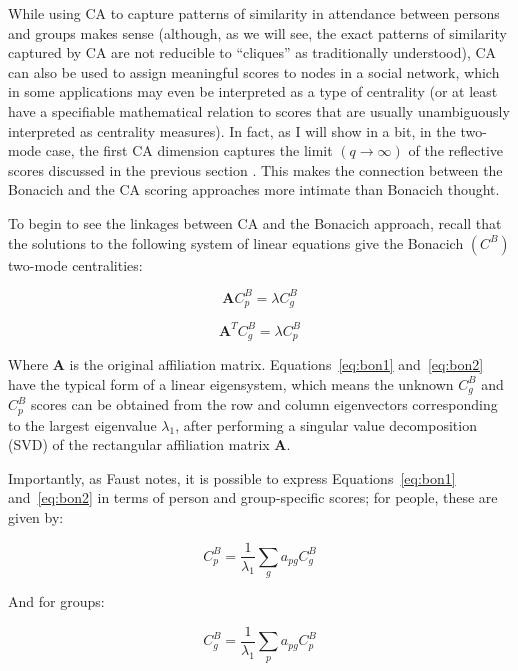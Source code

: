 \documentclass[a4paper,fleqn]{cas-sc}
\begin{document}
While using CA to capture patterns of similarity in attendance between persons and groups makes sense (although, as we will see, the exact patterns of similarity captured by CA are not reducible to ``cliques'' as traditionally understood), CA can also be used to assign meaningful scores to nodes in a social network, which in some applications may even be interpreted as a type of centrality (or at least have a specifiable mathematical relation to scores that are usually unambiguously interpreted as centrality measures). In fact, as I will show in a bit, in the two-mode case, the first CA dimension captures the limit $(q \rightarrow \infty)$ of the reflective scores discussed in the previous section \citep{mealy2019interpreting}. This makes the connection between the Bonacich and the CA scoring approaches more intimate than Bonacich thought. 

To begin to see the linkages between CA and the Bonacich approach, recall that the solutions to the following system of linear equations give the Bonacich $(C^B)$ two-mode centralities:

\begin{equation}
    \mathbf{A}C^B_p = \lambda C^B_g 
    \label{eq:bon1}
\end{equation}

\begin{equation}
    \mathbf{A}^TC^B_g = \lambda C^B_p 
    \label{eq:bon2}
\end{equation}

Where $\mathbf{A}$ is the original affiliation matrix. Equations~\ref{eq:bon1} and~\ref{eq:bon2} have the typical form of a linear eigensystem, which means the unknown $C^B_g$ and $C^B_p$ scores can be obtained from the row and column eigenvectors corresponding to the largest eigenvalue $\lambda_1$, after performing a singular value decomposition (SVD) of the rectangular affiliation matrix $\mathbf{A}$. 

Importantly, as Faust \citeyearpar[170]{faust1997centrality} notes, it is possible to express Equations~\ref{eq:bon1} and~\ref{eq:bon2} in terms of person and group-specific scores; for people, these are given by: 

\begin{equation}
    C^B_p = \frac{1}{\lambda_1}\sum_{g}a_{pg}C^B_g
    \label{eq:faust1}
\end{equation}

And for groups:

\begin{equation}
    C^B_g = \frac{1}{\lambda_1}\sum_{p}a_{pg}C^B_p
    \label{eq:faust2}
\end{equation}
\end{document}
